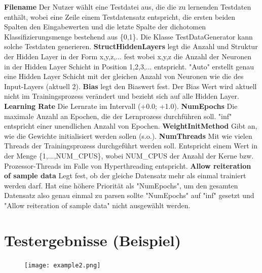 \documentclass[10pt]{article}
\begin{document}
\noindent \textbf{Filename} Der Nutzer wählt eine Testdatei aus, die die zu lernenden Testdaten enthält, wobei eine Zeile einem Testdatensatz entspricht, die ersten beiden Spalten den Eingabewerten und die letzte Spalte der dichotomen Klassifizierungsmenge bestehend aus \{0,1\}. Die Klasse TestDataGenerator kann solche Testdaten generieren.\newline
\textbf{StructHiddenLayers} legt die Anzahl und Struktur der Hidden Layer in der Form x,y,z,... fest wobei x,y,z die Anzahl der Neuronen in der Hidden Layer Schicht in Position 1,2,3,... entspricht. "Auto" erstellt genau eine Hidden Layer Schicht mit der gleichen Anzahl von Neuronen wie die des Input-Layers (aktuell 2).\newline
\textbf{Bias} legt den Biaswert fest. Der Bias Wert wird aktuell nicht im Trainingsprozess verändert und bezieht sich auf alle Hidden Layer.\newline
\textbf{Learning Rate} Die Lernrate im Intervall (+0.0; +1.0).\newline
\textbf{NumEpochs} Die maximale Anzahl an Epochen, die der Lernprozess durchführen soll. "inf" entspricht einer unendlichen Anzahl von Epochen.\newline
\textbf{WeightInitMethod} Gibt an, wie die Gewichte initialisiert werden sollen (s.o.).\newline
\textbf{NumThreads} Mit wie vielen Threads der Trainingsprozess durchgeführt werden soll. Entspricht einem Wert in der Menge \{1,...,NUM\_CPUS\}, wobei NUM\_CPUS der Anzahl der Kerne bzw. Prozessor-Threads im Falle von Hyperthreading entspricht.\newline
\textbf{Allow reiteration of sample data} Legt fest, ob der gleiche Datensatz mehr als einmal trainiert werden darf. Hat eine höhere Priorität als "NumEpochs", um den gesamten Datensatz also genau einmal zu parsen sollte "NumEpochs" auf "inf" gesetzt und "Allow reiteration of sample data" nicht ausgewählt werden.

\newpage

\section*{Testergebnisse (Beispiel)}

\begin{figure}[htp]
\centering
\texttt{[image: example2.png]}
\end{figure}
\end{document}
